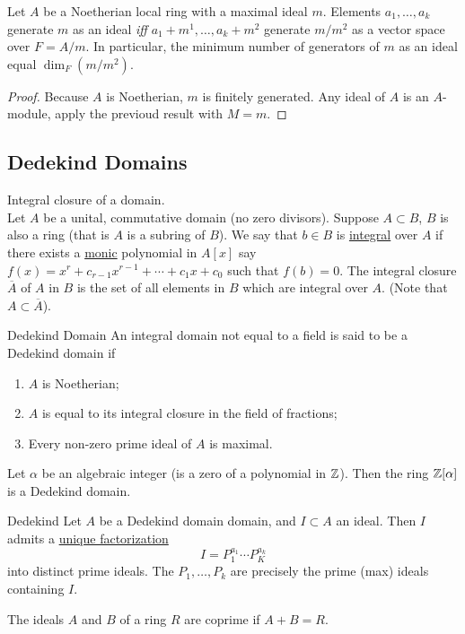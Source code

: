 \documentclass[twoside, openright, fontsize=10pt, headings=big]{scrbook}
\newcommand{\addunumberedsubsec}[1]{%
    \subsection*{#1}%
    \addcontentsline{toc}{subsection}{#1}%
}
\begin{document}
\begin{corollary}
    Let $A$ be a Noetherian local ring with a maximal ideal $m$. Elements $a_1,\dots,a_k$ generate $m$ as an ideal \textit{iff} $a_1+m^1,\dots,a_k+m^2$ generate $m/m^2$ as a vector space over $F=A/m$. In particular, the minimum number of generators of $m$ as an ideal equal $\dim_F(m/m^2)$.
\end{corollary}
\begin{proof}
    Because $A$ is Noetherian, $m$ is finitely generated. Any ideal of $A$ is an $A$-module, apply the previoud result with $M=m$. 
\end{proof}
\addunumberedsubsec{Dedekind Domains}
Integral closure of a domain.\\
Let $A$ be a unital, commutative domain (no zero divisors). Suppose $A\subset B$, $B$ is also a ring (that is $A$ is a subring of $B$). We say that $b\in B$ is \underline{integral} over $A$ if there exists a \underline{monic} polynomial in $A[x]$ say $f(x)=x^r+c_{r-1}x^{r-1}+\cdots+c_1x+c_0$ such that $f(b)=0$. The integral closure $\overline{A}$ of $A$ in $B$ is the set of all elements in $B$ which are integral over $A$. (Note that $A\subset \overline{A}$). 
\begin{definition}{Dedekind Domain}{}
    An integral domain not equal to a field is said to be a Dedekind domain if 
    \begin{enumerate}[label=(\alph*)]
        \item $A$ is Noetherian;
        \item $A$ is equal to its integral closure in the field of fractions;
        \item Every non-zero prime ideal of $A$ is maximal. 
    \end{enumerate}
\end{definition}
\begin{theorem}{}{}
    Let $\alpha$ be an algebraic integer (is a zero of a polynomial in $\mathbb{Z}$). Then the ring $\mathbb{Z}[\alpha]$ is a Dedekind domain. 
\end{theorem}
\begin{theorem}{Dedekind}{}
    Let $A$ be a Dedekind domain domain, and $I\subset A$ an ideal. Then $I$ admits a \underline{unique factorization}
    \[
        I=P_1^{a_1}\cdots P_K^{a_k}
    \]
    into distinct prime ideals. The $P_1,\dots,P_k$ are precisely the prime (max) ideals containing $I$.
\end{theorem}
The ideals $A$ and $B$ of a ring $R$ are coprime if $A+B=R$.
\end{document}
